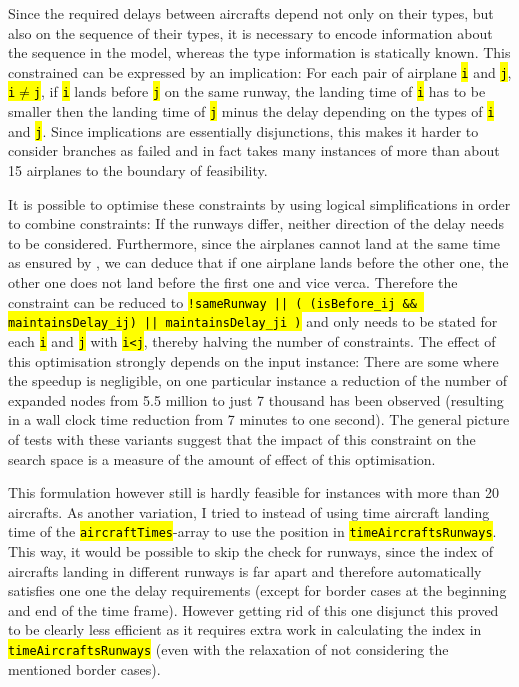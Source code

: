 \documentclass[,%
			paper=a4,%
			DIV11,
			liststotoc,
			bibtotoc,
			draft=false,%
			numbers=noendperiod
			]{scrartcl}
\newcommand{\ilc}[1]{\hl{\texttt{#1}}}
\newcommand{\mymarginnote}[1]{\marginnote{\footnotesize{#1}}}
\begin{document}
\mymarginnote{\CseqDel}
Since the required delays between aircrafts depend not only on their types, but also on the sequence of their types, it is necessary to encode information about the sequence in the model, whereas the type information is statically known.
This constrained can be expressed by an implication: For each pair of airplane \ilc{i} and \ilc{j}, \ilc{i$\neq$j}, if \ilc{i} lands before \ilc{j} on the same runway, the landing time of \ilc{i} has to be smaller then the landing time of \ilc{j} minus the delay depending on the types of \ilc{i} and \ilc{j}.
Since implications are essentially disjunctions, this makes it harder to consider branches as failed and in fact takes many instances of more than about 15 airplanes to the boundary of feasibility.

It is possible to optimise these constraints by using logical simplifications in order to combine constraints: If the runways differ, neither direction of the delay needs to be considered. Furthermore, since the airplanes cannot land at the same time as ensured by \Crunway, we can deduce that if one airplane lands before the other one, the other one does not land before the first one and vice verca. Therefore the constraint can be reduced to \ilc{!sameRunway || ( (isBefore\_ij \&\& maintainsDelay\_ij) || maintainsDelay\_ji )} and only needs to be stated for each \ilc{i} and \ilc{j} with \ilc{i<j}, thereby halving the number of constraints.
The effect of this optimisation strongly depends on the input instance: There are some where the speedup is negligible, on one particular instance a reduction of the number of expanded nodes from 5.5 million to just 7 thousand has been observed (resulting in a wall clock time reduction from 7 minutes to one second).
The general picture of tests with these variants suggest that the impact of this constraint on the search space is a measure of the amount of effect of this optimisation.

This formulation however still is hardly feasible for instances with more than 20 aircrafts. As another variation, I tried to instead of using time aircraft landing time of the \ilc{aircraftTimes}-array to use the position in \ilc{timeAircraftsRunways}.
This way, it would be possible to skip the check for runways, since the index of aircrafts landing in different runways is far apart and therefore automatically satisfies one one the delay requirements (except for border cases at the beginning and end of the time frame).
However getting rid of this one disjunct this proved to be clearly less efficient as it requires extra work in calculating the index in \ilc{timeAircraftsRunways} (even with the relaxation of not considering the mentioned border cases).
\end{document}

